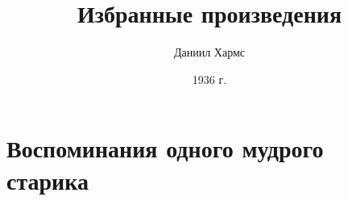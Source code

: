 \documentclass{book}
\begin{document}
\author{Даниил Хармс}
\title{Избранные произведения}
\date{1936 г.}
\maketitle
\chapter{Воспоминания одного мудрого старика}

\end{document}
